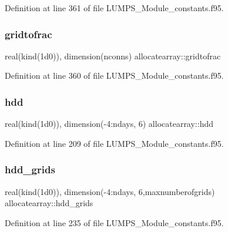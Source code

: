 Definition at line 361 of file L\+U\+M\+P\+S\+\_\+\+Module\+\_\+constants.\+f95.

\mbox{\label{namespaceallocatearray_a07eae9a32f308646702ed56a2d5c345a}} 
\subsubsection{\texorpdfstring{gridtofrac}{gridtofrac}}
{\footnotesize\ttfamily real(kind(1d0)), dimension(nconns) allocatearray\+::gridtofrac}



Definition at line 360 of file L\+U\+M\+P\+S\+\_\+\+Module\+\_\+constants.\+f95.

\mbox{\label{namespaceallocatearray_aae45e57c1b2d211392c5f98300524ee8}} 
\subsubsection{\texorpdfstring{hdd}{hdd}}
{\footnotesize\ttfamily real(kind(1d0)), dimension(-\/4\+:ndays, 6) allocatearray\+::hdd}



Definition at line 209 of file L\+U\+M\+P\+S\+\_\+\+Module\+\_\+constants.\+f95.

\mbox{\label{namespaceallocatearray_a611f940db5f9be9de91624d968683688}} 
\subsubsection{\texorpdfstring{hdd\+\_\+grids}{hdd\_grids}}
{\footnotesize\ttfamily real(kind(1d0)), dimension(-\/4\+:ndays, 6,maxnumberofgrids) allocatearray\+::hdd\+\_\+grids}



Definition at line 235 of file L\+U\+M\+P\+S\+\_\+\+Module\+\_\+constants.\+f95.

\mbox{\label{namespaceallocatearray_a79c2984467ad2372c14bf2b1bab91392}} 
